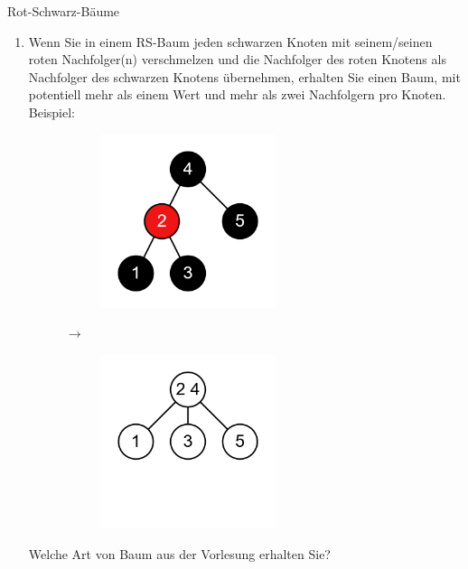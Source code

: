 \documentclass[11pt,a4paper]{article}
\begin{document}
\begin{aufgabe}{2}{Rot-Schwarz-Bäume}
\begin{enumerate}
        \item Wenn Sie in einem RS-Baum jeden schwarzen Knoten mit seinem/seinen roten Nachfolger(n) verschmelzen und die Nachfolger des roten Knotens als Nachfolger des schwarzen Knotens übernehmen, erhalten Sie einen Baum, mit potentiell mehr als einem Wert und mehr als zwei Nachfolgern pro Knoten.
        Beispiel:
        \begin{figure}[h!]
            \centering
            \begin{subfigure}[c]{0.2\textwidth}
                \centering
                \includegraphics[width=0.6\textwidth]{img/2d_1}
            \end{subfigure}
            $\rightarrow$
            \begin{subfigure}[c]{0.2\textwidth}
                \centering
                \includegraphics[width=0.6\textwidth]{img/2d_2}
            \end{subfigure}
        \end{figure}
        \FloatBarrier
        Welche Art von Baum aus der Vorlesung erhalten Sie?

\end{enumerate}
\end{aufgabe}
\end{document}
